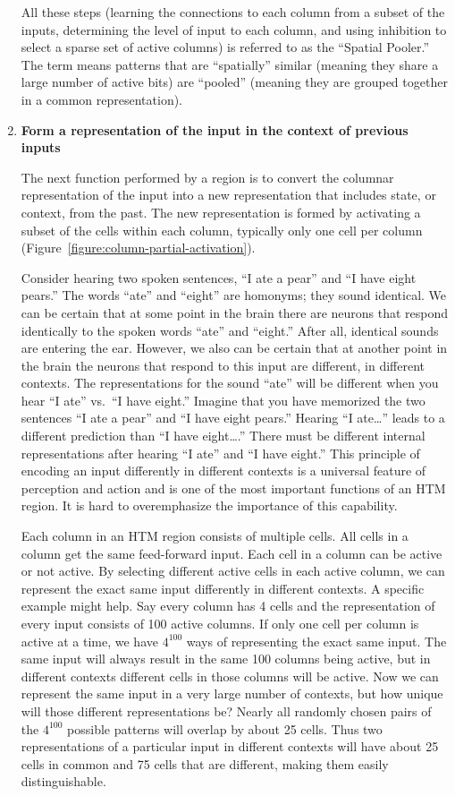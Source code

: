 \documentclass{report}
\begin{document}
\begin{enumerate}
All these steps (learning the connections to each column from a subset
of the inputs, determining the level of input to each column, and
using inhibition to select a sparse set of active columns) is referred
to as the ``Spatial Pooler.'' The term means patterns that are
``spatially'' similar (meaning they share a large number of active
bits) are ``pooled'' (meaning they are grouped together in a common
representation).

\item {\bf Form a representation of the input in the context of
  previous inputs}

The next function performed by a region is to convert the columnar
representation of the input into a new representation that includes
state, or context, from the past. The new representation is formed by
activating a subset of the cells within each column, typically only
one cell per column (Figure~\ref{figure:column-partial-activation}).

Consider hearing two spoken sentences, ``I ate a pear'' and ``I have
eight pears.'' The words ``ate'' and ``eight'' are homonyms; they
sound identical. We can be certain that at some point in the brain
there are neurons that respond identically to the spoken words ``ate''
and ``eight.'' After all, identical sounds are entering the
ear. However, we also can be certain that at another point in the
brain the neurons that respond to this input are different, in
different contexts. The representations for the sound ``ate'' will be
different when you hear ``I ate'' vs.\ ``I have eight.'' Imagine that
you have memorized the two sentences ``I ate a pear'' and ``I have
eight pears.'' Hearing ``I ate\dots'' leads to a different prediction
than ``I have eight\dots.'' There must be different internal
representations after hearing ``I ate'' and ``I have eight.'' This
principle of encoding an input differently in different contexts is a
universal feature of perception and action and is one of the most
important functions of an HTM region. It is hard to overemphasize the
importance of this capability.

Each column in an HTM region consists of multiple cells. All cells in
a column get the same feed-forward input. Each cell in a column can be
active or not active. By selecting different active cells in each
active column, we can represent the exact same input differently in
different contexts. A specific example might help. Say every column
has 4 cells and the representation of every input consists of 100
active columns. If only one cell per column is active at a time, we
have $4^{100}$ ways of representing the exact same input. The same
input will always result in the same 100 columns being active, but in
different contexts different cells in those columns will be
active. Now we can represent the same input in a very large number of
contexts, but how unique will those different representations be?
Nearly all randomly chosen pairs of the $4^{100}$ possible patterns
will overlap by about 25 cells. Thus two representations of a
particular input in different contexts will have about 25 cells in
common and 75 cells that are different, making them easily
distinguishable.


\end{enumerate}
\end{document}
